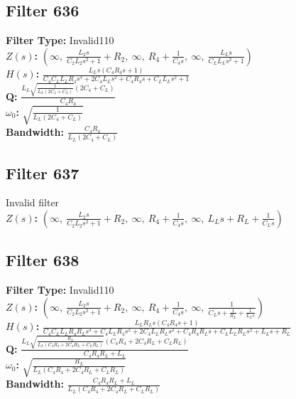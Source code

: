 \documentclass{article}
\begin{document}
\subsection*{Filter 636}
\textbf{Filter Type:} Invalid110 \\ 
\textbf{$Z(s)$:} $\left( \infty, \  \frac{L_{2} s}{C_{2} L_{2} s^{2} + 1} + R_{2}, \  \infty, \  R_{4} + \frac{1}{C_{4} s}, \  \infty, \  \frac{L_{L} s}{C_{L} L_{L} s^{2} + 1}\right)$ \\ 
\textbf{$H(s)$:} $\frac{L_{L} s \left(C_{4} R_{4} s + 1\right)}{C_{4} C_{L} L_{L} R_{4} s^{3} + 2 C_{4} L_{L} s^{2} + C_{4} R_{4} s + C_{L} L_{L} s^{2} + 1}$ \\ 
\textbf{Q:} $\frac{L_{L} \sqrt{\frac{1}{L_{L} \left(2 C_{4} + C_{L}\right)}} \left(2 C_{4} + C_{L}\right)}{C_{4} R_{4}}$ \\ 
\textbf{$\omega_0$:} $\sqrt{\frac{1}{L_{L} \left(2 C_{4} + C_{L}\right)}}$ \\ 
\textbf{Bandwidth:} $\frac{C_{4} R_{4}}{L_{L} \left(2 C_{4} + C_{L}\right)}$ \\ 
\subsection*{Filter 637}
Invalid filter \\ 
\textbf{$Z(s)$:} $\left( \infty, \  \frac{L_{2} s}{C_{2} L_{2} s^{2} + 1} + R_{2}, \  \infty, \  R_{4} + \frac{1}{C_{4} s}, \  \infty, \  L_{L} s + R_{L} + \frac{1}{C_{L} s}\right)$ \\ 
\subsection*{Filter 638}
\textbf{Filter Type:} Invalid110 \\ 
\textbf{$Z(s)$:} $\left( \infty, \  \frac{L_{2} s}{C_{2} L_{2} s^{2} + 1} + R_{2}, \  \infty, \  R_{4} + \frac{1}{C_{4} s}, \  \infty, \  \frac{1}{C_{L} s + \frac{1}{R_{L}} + \frac{1}{L_{L} s}}\right)$ \\ 
\textbf{$H(s)$:} $\frac{L_{L} R_{L} s \left(C_{4} R_{4} s + 1\right)}{C_{4} C_{L} L_{L} R_{4} R_{L} s^{3} + C_{4} L_{L} R_{4} s^{2} + 2 C_{4} L_{L} R_{L} s^{2} + C_{4} R_{4} R_{L} s + C_{L} L_{L} R_{L} s^{2} + L_{L} s + R_{L}}$ \\ 
\textbf{Q:} $\frac{L_{L} \sqrt{\frac{R_{L}}{L_{L} \left(C_{4} R_{4} + 2 C_{4} R_{L} + C_{L} R_{L}\right)}} \left(C_{4} R_{4} + 2 C_{4} R_{L} + C_{L} R_{L}\right)}{C_{4} R_{4} R_{L} + L_{L}}$ \\ 
\textbf{$\omega_0$:} $\sqrt{\frac{R_{L}}{L_{L} \left(C_{4} R_{4} + 2 C_{4} R_{L} + C_{L} R_{L}\right)}}$ \\ 
\textbf{Bandwidth:} $\frac{C_{4} R_{4} R_{L} + L_{L}}{L_{L} \left(C_{4} R_{4} + 2 C_{4} R_{L} + C_{L} R_{L}\right)}$ \\ 
\end{document}
